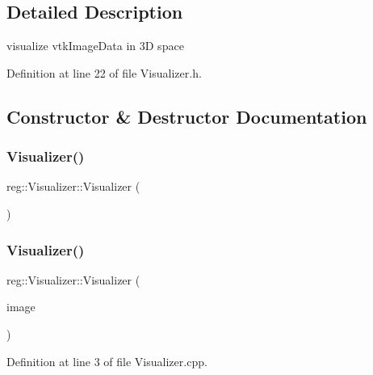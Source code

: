 \subsection{Detailed Description}
visualize vtk\+Image\+Data in 3D space 

Definition at line 22 of file Visualizer.\+h.



\subsection{Constructor \& Destructor Documentation}
\mbox{\label{structreg_1_1_visualizer_a7b2aa4228668fdd9e9c174fc060d2fb9}} 
\subsubsection{\texorpdfstring{Visualizer()}{Visualizer()}\hspace{0.1cm}{\footnotesize\ttfamily [1/2]}}
{\footnotesize\ttfamily reg\+::\+Visualizer\+::\+Visualizer (\begin{DoxyParamCaption}{ }\end{DoxyParamCaption})\hspace{0.3cm}{\ttfamily [default]}}

\mbox{\label{structreg_1_1_visualizer_a0746fc30028f0293bedd23468dae4d43}} 
\subsubsection{\texorpdfstring{Visualizer()}{Visualizer()}\hspace{0.1cm}{\footnotesize\ttfamily [2/2]}}
{\footnotesize\ttfamily reg\+::\+Visualizer\+::\+Visualizer (\begin{DoxyParamCaption}\item[{vtk\+Image\+Data $\ast$}]{image }\end{DoxyParamCaption})}



Definition at line 3 of file Visualizer.\+cpp.



